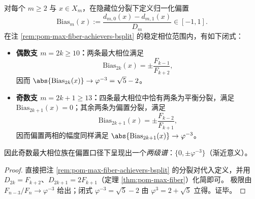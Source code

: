 \begin{corollary}\label{cor:pom-max-fiber-hidden-bit-bias-spectrum}
对每个 \(m\ge 2\) 与 \(x\in X_m\)，在隐藏位分裂下定义归一化偏置
\[
\mathrm{Bias}_m(x):=\frac{d_{m,0}(x)-d_{m,1}(x)}{D_m}\in[-1,1].
\]
在注 \ref{rem:pom-max-fiber-achievers-bsplit} 的稳定相位范围内，有如下闭式：
\begin{itemize}
  \item \textbf{偶数支 \(m=2k\ge 10\)：}两条最大相位满足
  \[
  \mathrm{Bias}_{2k}(x)=\pm\frac{F_{k-1}}{F_{k+2}},
  \]
  因而 \(\abs{\mathrm{Bias}_{2k}(x)}\to \varphi^{-3}=\sqrt5-2\)。
  \item \textbf{奇数支 \(m=2k+1\ge 13\)：}四条最大相位中恰有两条为平衡分裂，满足 \(\mathrm{Bias}_{2k+1}(x)=0\)；其余两条为偏置分裂，满足
  \[
  \mathrm{Bias}_{2k+1}(x)=\pm\frac{F_{k-2}}{F_{k+1}},
  \]
  因而偏置两相的幅度同样满足 \(\abs{\mathrm{Bias}_{2k+1}(x)}\to \varphi^{-3}\)。
\end{itemize}
因此奇数最大相位族在偏置口径下呈现出一个\emph{两级谱}：\(\{0,\pm\varphi^{-3}\}\)（渐近意义）。
\end{corollary}
\begin{proof}
直接把注 \ref{rem:pom-max-fiber-achievers-bsplit} 的分裂对代入定义，并用 \(D_{2k}=F_{k+2}\)、\(D_{2k+1}=2F_{k+1}\)（定理 \ref{thm:pom-max-fiber}）化简即可。
极限由 \(F_{n-3}/F_n\to \varphi^{-3}\) 给出；闭式 \(\varphi^{-3}=\sqrt5-2\) 由 \(\varphi^3=2+\sqrt5\) 立得。证毕。
\end{proof}

